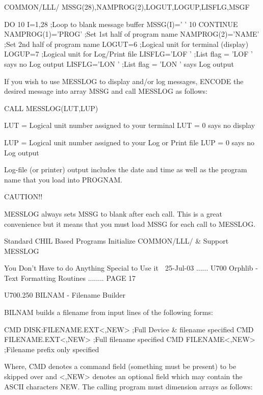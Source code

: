          COMMON/LLL/ MSSG(28),NAMPROG(2),LOGUT,LOGUP,LISFLG,MSGF
 
          DO 10 I=1,28           ;Loop to blank message buffer
          MSSG(I)='    '
       10 CONTINUE
          NAMPROG(1)='PROG'      ;Set 1st half of program name
          NAMPROG(2)='NAME'      ;Set 2nd half of program name
          LOGUT=6                ;Logical unit for terminal (display)
          LOGUP=7                ;Logical unit for Log/Print file
          LISFLG='LOF '          ;List flag = 'LOF ' says no Log output
          LISFLG='LON '          ;List flag = 'LON ' says    Log output
 
   If  you  wish  to  use  MESSLOG  to display and/or log messages, ENCODE the
   desired message into array MSSG and call MESSLOG as follows:
 
          CALL MESSLOG(LUT,LUP)
 
   LUT = Logical unit number assigned to your terminal
   LUT = 0 says no display
 
   LUP = Logical unit number assigned to your Log or Print file
   LUP = 0 says no Log output
 
   Log-file (or printer) output includes the date and  time  as  well  as  the
   program name that you load into PROGNAM.
 
                                    CAUTION!!
 
   MESSLOG  always  sets  MSSG  to  blank  after  each  call.  This is a great
   convenience but it means that you must load MSSG for each call to MESSLOG.
 
 
      Standard CHIL Based Programs Initialize COMMON/LLL/ & Support MESSLOG
 
                 You Don't Have to do Anything Special to Use it
    
   25-Jul-03 ...... U700  Orphlib - Text Formatting Routines ........ PAGE  17
 
 
   U700.250  BILNAM   - Filename Builder
 
   BILNAM builds a filename from input lines of the following forms:
 
   CMD DISK:FILENAME.EXT<,NEW>      ;Full Device & filename specified
   CMD FILENAME.EXT<,NEW>           ;Full filename specified
   CMD FILENAME<,NEW>               ;Filename prefix only specified
 
   Where, CMD denotes a command  field  (something  must  be  present)  to  be
   skipped  over  and  <,NEW>  denotes an optional field which may contain the
   ASCII characters NEW. The calling program must dimension arrays as follows:
 
